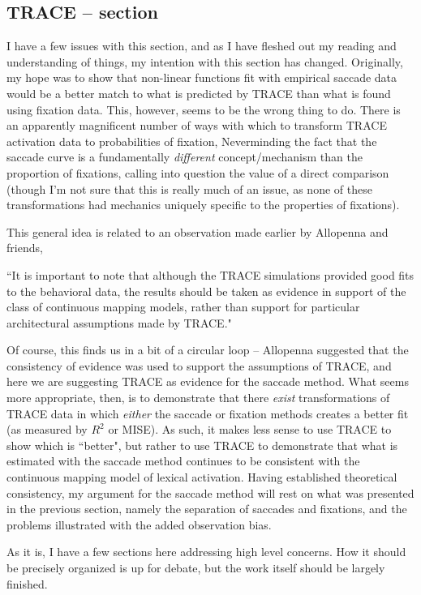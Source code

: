 \documentclass{article}
\begin{document}
\subsection{TRACE -- section}

I have a few issues with this section, and as I have fleshed out my reading and understanding of things, my intention with this section has changed. Originally, my hope was to show that non-linear functions fit with empirical saccade data would be a better match to what is predicted by TRACE than what is found using fixation data. This, however, seems to be the wrong thing to do. There is an apparently magnificent number of ways with which to transform TRACE activation data to probabilities of fixation, Neverminding the fact that the saccade curve is a fundamentally \textit{different} concept/mechanism than the proportion of fixations, calling into question the value of a direct comparison (though I'm not sure that this is really much of an issue, as none of these transformations had mechanics uniquely specific to the properties of fixations).

This general idea is related to an observation made earlier by Allopenna and friends, 

``It is important to note that although the TRACE simulations provided good fits to the behavioral data, the results should be taken as evidence in support of the class of continuous mapping models, rather than support for particular architectural assumptions made by TRACE."

Of course, this finds us in a bit of a circular loop -- Allopenna suggested that the consistency of evidence was used to support the assumptions of TRACE, and here we are suggesting TRACE as evidence for the saccade method. What seems more appropriate, then, is to demonstrate that there \textit{exist} transformations of TRACE data in which \textit{either} the saccade or fixation methods creates a better fit (as measured by $R^2$ or MISE). As such, it makes less sense to use TRACE to show which is ``better", but rather to use TRACE to demonstrate that what is estimated with the saccade method continues to be consistent with the continuous mapping model of lexical activation. Having established theoretical consistency, my argument for the saccade method will rest on what was presented in the previous section, namely the separation of saccades and fixations, and the problems illustrated with the added observation bias. 

As it is, I have a few sections here addressing high level concerns. How it should be precisely organized is up for debate, but the work itself should be largely finished.
\end{document}
